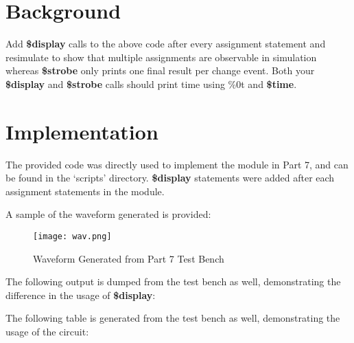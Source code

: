 \documentclass[paper=usletter, fontsize=12pt]{article}
\begin{document}
    \vspace{-0.1in}

    \section{Background}
    Add \textbf{\$display} calls to the above code after every assignment statement and resimulate to show that multiple assignments are observable in simulation whereas \textbf{\$strobe} only prints one final result per change event. Both your \textbf{\$display} and \textbf{\$strobe} calls should print time using \%0t and \textbf{\$time}.

    \section{Implementation}
    The provided code was directly used to implement the module in Part 7, and can be found in the `scripts' directory. \textbf{\$display} statements were added after each assignment statements in the module.

    A sample of the waveform generated is provided:

    \begin{figure}[ht]
        \begin{center}
            \texttt{[image: wav.png]}
            \caption{Waveform Generated from Part 7 Test Bench} \label{fig:wav}
        \end{center}
    \end{figure}

    The following output is dumped from the test bench as well, demonstrating the difference in the usage of \textbf{\$display}:

    The following table is generated from the test bench as well, demonstrating the usage of the circuit:
\end{document}
